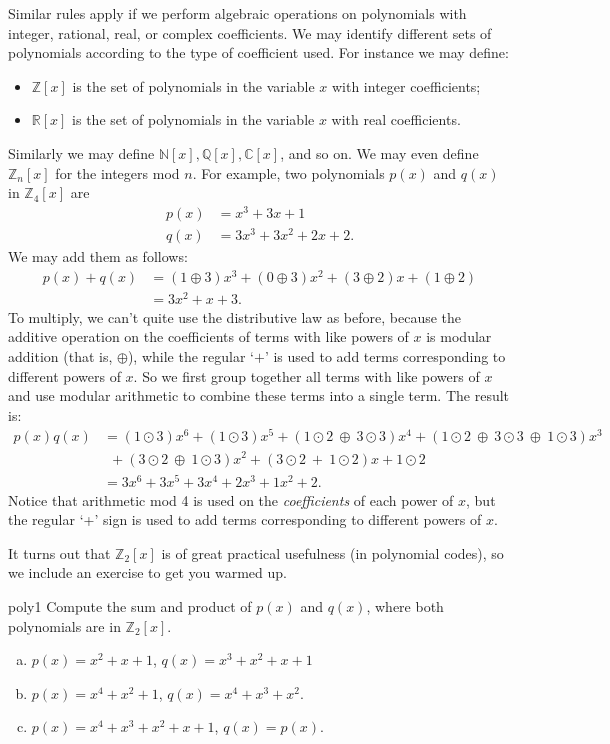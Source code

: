 Similar rules apply if we perform algebraic operations on polynomials with integer, rational, real, or complex coefficients. We may identify different sets of polynomials according to the type of coefficient used. For instance we may define:
\begin{itemize}
\item
$\mathbb{Z}[x]$ is the set of polynomials in the variable $x$ with integer coefficients;
\item
$\mathbb{R}[x]$ is the set of polynomials in the variable $x$ with real coefficients.
\end{itemize}
Similarly we may define $\mathbb{N}[x], \mathbb{Q}[x], \mathbb{C}[x]$, and so on. We may even define $\mathbb{Z}_n[x]$ for the integers mod $n$. For example, two polynomials $p(x)$ and $q(x)$ in $\mathbb{Z}_4[x]$ are
\begin{align*} 
p(x) & = x^3 + 3x +1 \\
q(x) & = 3x^3 + 3x^2 + 2x +2.
\end{align*}
We may add them as follows:
\begin{align*}
p(x) + q(x) &= (1\oplus 3)x^3 + (0\oplus 3)x^2 + (3\oplus 2)x + (1\oplus 2)\\
&= 3x^2 + x + 3.
\end{align*}
To multiply, we can't quite use the distributive law as before, because the additive operation on the coefficients of terms with like powers of $x$ is modular addition (that is, $\oplus$), while the regular `$+$' is used to add terms corresponding to different powers of $x$.  So we first group together all terms with like powers of $x$ and use modular arithmetic to combine  these terms into a single term.  The result is:
\begin{align*}
p(x)  q(x) 
& =  (1 \odot 3)x^6 + (1 \odot 3)x^5 + (1\odot2~\oplus~ 3\odot 3)x^4 + (1\odot 2 ~\oplus~ 3\odot 3 ~\oplus~  1 \odot 3)x^3 \\
&~~+ (3 \odot 2 ~\oplus~  1 \odot 3)x^2 + (3 \odot 2 ~+ ~1 \odot 2)x + 1\odot 2 \\
& = 3x^6 + 3x^5 + 3x^4 + 2x^3 + 1x^2 + 2.
\end{align*}
Notice that arithmetic mod 4 is used on the \emph{coefficients} of each power of $x$, but  the regular `+' sign is used to add terms corresponding to different powers of $x$.  

It turns out that $\mathbb{Z}_2[x]$ is of great practical usefulness (in polynomial codes), so we include an exercise to get you warmed up.

\begin{exercise}{poly1}
Compute the sum and product of $p(x)$ and $q(x)$, where both polynomials are in $\mathbb{Z}_2[x]$.
\begin{enumerate}[(a)]
\item
$p(x)= x^2 + x + 1$, $q(x)=x^3 +x^2+x+1$
\item
$p(x)= x^4 + x^2+1$, $q(x)=x^4 +x^3+x^2$.
\item
$p(x)= x^4 + x^3+x^2+x+1$, $q(x)=p(x)$.
\end{enumerate}
\end{exercise}

